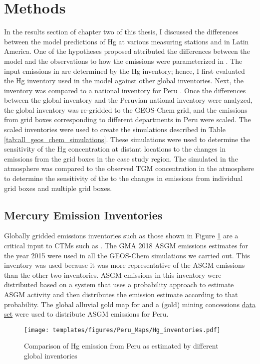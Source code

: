 \section{Methods}
\begin{flushleft}
    In the results section of chapter two of this thesis, I discussed the differences between the \gc model predictions of Hg at various measuring stations and in Latin America. One of the hypotheses proposed attributed the differences between the model and the observations to how the emissions were parameterized in \gc. The input emissions in \gc are determined by the Hg inventory; hence, I first evaluated the Hg inventory used in the model against other global inventories. Next, the inventory was compared to a national inventory for Peru \cite{agc_reporte_2017}. Once the differences between the global inventory\cite{steenhuisen_development_2019} and the Peruvian national inventory were analyzed, the global inventory was re-gridded to the GEOS-Chem grid, and the emissions from grid boxes corresponding to different departments in Peru were scaled. The scaled inventories were used to create the simulations described in Table \ref{tab:all_geos_chem_simulations}. These simulations were used to determine the sensitivity of the Hg concentration at distant locations to the changes in emissions from the grid boxes in the case study region. The simulated \hgc in the atmosphere was compared to the observed TGM concentration in the atmosphere to determine the sensitivity of the \hgc to the changes in emissions from individual grid boxes and multiple grid boxes. 
\end{flushleft}

\subsection{Mercury Emission Inventories}
\begin{flushleft}


Globally gridded emissions inventories such as those shown in Figure \ref{fig:Hg_inventories} are a critical input to CTMs such as \gc. The GMA 2018 ASGM emissions estimates for the year 2015 were used in all the GEOS-Chem simulations we carried out. This inventory was used because it was more representative of the ASGM emissions than the other two inventories. ASGM emissions in this inventory were distributed based on a system that uses a probability approach to estimate ASGM activity and then distributes the emission estimate according to that probability\cite{steenhuisen_development_2019}. The global alluvial gold map for  and a (gold) mining concessions  \href{(https://data.globalforestwatch.org/search?collection=Dataset&q=mining)}{data set} were used to distribute ASGM emissions for Peru. 
\end{flushleft}
\begin{figure}[H]
  \texttt{[image: templates/figures/Peru\_Maps/Hg\_inventories.pdf]}
  \centering
  \caption{Comparison of Hg emission from Peru as estimated by different global inventories \cite{united_nations_environment_programme_technical_2019,steenhuisen_development_2019,muntean_evaluating_2018,streets_global_2019}}
  \label{fig:Hg_inventories}
\end{figure}
\FloatBarrier


